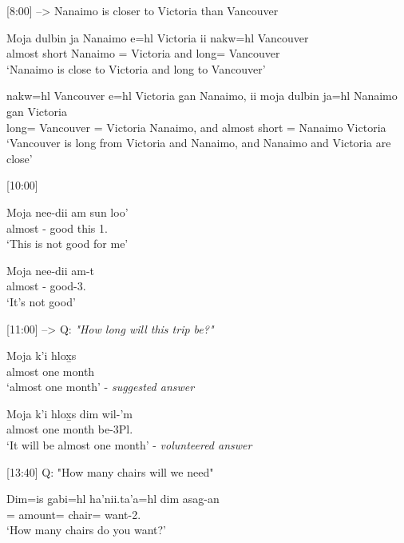 [8:00] --> Nanaimo is closer to Victoria than Vancouver
\begin{exe}
\ex \begin{xlist}
\item \gll Moja dulbin ja Nanaimo e=hl Victoria ii nakw=hl Vancouver\\
almost short \Irr{} Nanaimo \Prep{}=\Cn{} Victoria and long=\Cn{} Vancouver\\
`Nanaimo is close to Victoria and long to Vancouver'
\item \gll nakw=hl Vancouver e=hl Victoria g̱an Nanaimo, ii moja dulbin ja=hl Nanaimo g̱an Victoria\\
long=\Cn{} Vancouver \Prep{}=\Cn{} Victoria \Pcnj{} Nanaimo, and almost short \Irr{}=\Cn{} Nanaimo \Pcnj{} Victoria\\
`Vancouver is long from Victoria and Nanaimo, and Nanaimo and Victoria are close' 
\end{xlist}
\end{exe}

[10:00]
\begin{exe}
\ex \begin{xlist}
\item \gll Moja nee-dii am sun loo'\\
almost \Neg{}-\Foc{} good this 1.\Prep{}\\
`This is not good for me'
\item \gll Moja nee-dii am-t\\
almost \Neg{}-\Foc{} good-3.\Ii{}\\
`It's not good'
\end{xlist}
\end{exe}

[11:00] --> Q: \textit{"How long will this trip be?"}
\begin{exe}
\ex \begin{xlist}
\item \gll Moja k'i hlox̱s\\
almost one month\\
`almost one month' - \textit{suggested answer}
\item \gll Moja k'i hlox̱s dim wil-'m\\
almost one month \Fut{} be-3Pl.\Ii{}\\
`It will be almost one month' - \textit{volunteered answer}
\end{xlist}
\end{exe}

[13:40] Q: "How many chairs will we need"
\begin{exe}
\ex \gll Dim=is g̱abi=hl ha'nii.ta'a=hl dim asag̱-an\\
\Fut{}=\Qudd{} amount=\Cn{} chair=\Cn{} \Fut{} want-2.\Ii{}\\
`How many chairs do you want?'
\end{exe}

